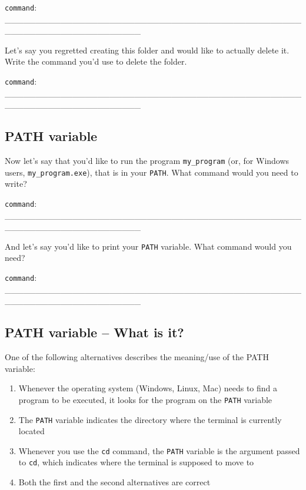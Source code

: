 \documentclass[a4paper,11pt]{scrartcl}
\begin{document}
\verb|command|: \_\_\_\_\_\_\_\_\_\_\_\_\_\_\_\_\_\_\_\_\_\_\_\_\_\_\_\_\_\_\_\_\_\_\_\_\_\_\_\_\_\_\_\_\_\_\_\_\_\_\_\_\_\_\_\_\_\_\_\_\_\_\_\_\_\_\_\_\_\_

Let's say you regretted creating this folder and would like to actually delete
it. Write the command you'd use to delete the folder.

\verb|command|: \_\_\_\_\_\_\_\_\_\_\_\_\_\_\_\_\_\_\_\_\_\_\_\_\_\_\_\_\_\_\_\_\_\_\_\_\_\_\_\_\_\_\_\_\_\_\_\_\_\_\_\_\_\_\_\_\_\_\_\_\_\_\_\_\_\_\_\_\_\_



\subsection{PATH variable}

Now let's say that you'd like to run the program \verb|my_program| (or, for
Windows users, \verb|my_program.exe|), that is in your \verb|PATH|. What
command would you need to write?

\verb|command|: \_\_\_\_\_\_\_\_\_\_\_\_\_\_\_\_\_\_\_\_\_\_\_\_\_\_\_\_\_\_\_\_\_\_\_\_\_\_\_\_\_\_\_\_\_\_\_\_\_\_\_\_\_\_\_\_\_\_\_\_\_\_\_\_\_\_\_\_\_\_
 

And let's say you'd like to print your \verb|PATH| variable. What command
would you need?

\verb|command|: \_\_\_\_\_\_\_\_\_\_\_\_\_\_\_\_\_\_\_\_\_\_\_\_\_\_\_\_\_\_\_\_\_\_\_\_\_\_\_\_\_\_\_\_\_\_\_\_\_\_\_\_\_\_\_\_\_\_\_\_\_\_\_\_\_\_\_\_\_\_
 

\subsection{PATH variable -- What is it?}

One of the following alternatives describes the meaning/use of the PATH variable:

\begin{enumerate}[label=\alph*)]
\onehalfspacing
\item Whenever the operating system (Windows, Linux, Mac) needs to find a
program to be executed, it looks for the program on the \verb|PATH| variable

\item The \verb|PATH| variable indicates the directory where the terminal
is currently located

\item Whenever you use the \verb|cd| command, the \verb|PATH| variable is
the argument passed to \verb|cd|, which indicates where the terminal is supposed
to move to

\item Both the first and the second alternatives are correct
\end{enumerate}
\end{document}
